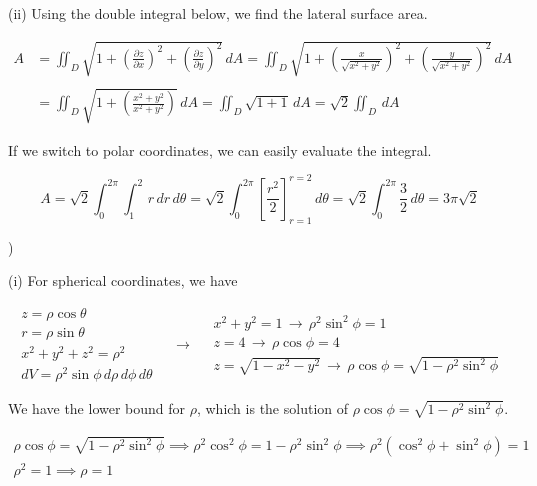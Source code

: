 \documentclass{article}
\begin{document}
\hfill

\noindent (ii) Using the double integral below, we find the lateral surface area.

\begin{align*}
A&=\iint_D\sqrt{1+\left(\frac{\partial z}{\partial x}\right)^2 +\left(\frac{\partial z}{\partial y}\right)^2}\,dA= \iint_D\sqrt{1+\left(\frac{x}{\sqrt{x^2+y^2}}\right)^2 +\left(\frac{y}{\sqrt{x^2+y^2}}\right)^2}\,dA \\\\&=\iint_D\sqrt{1+\left(\frac{x^2+y^2}{x^2+y^2}\right)}\,dA=\iint_D\sqrt{1+1}\,dA=\sqrt{2}\iint_D\,dA
\end{align*}

\hfill

\noindent If we switch to polar coordinates, we can easily evaluate the integral.

\begin{equation*}A=\sqrt2\int_0^{2\pi}\int_1^2\,r\,dr\,d\theta=\sqrt2\int_0^{2\pi}\left[\frac{r^2}2\right]_{r=1}^{r=2}\,d\theta=\sqrt2\int_0^{2\pi}\frac32\,d\theta=\boxed{3\pi\sqrt2}\end{equation*}

\newpage

)

\hfill

\noindent (i) For spherical coordinates, we have

\[
\begin{array}{c}
z=\rho\cos\theta\\
r=\rho\sin\theta\\
x^2+y^2+z^2=\rho^2\\
dV=\rho^2\sin\phi\,d\rho\,d\phi\,d\theta
\end{array}\quad\rightarrow\quad
\begin{array}{c}
x^2+y^2=1\,\rightarrow\,\rho^2\sin^2\phi = 1\\
z=4\,\rightarrow\,\rho\cos\phi=4\\
z=\sqrt{1-x^2-y^2}\,\rightarrow\,\rho\cos\phi=\sqrt{1-\rho^2\sin^2\phi}
\end{array}
\]

\hfill

\noindent We have the lower bound for $\rho$, which is the solution of $\rho\cos\phi=\sqrt{1-\rho^2\sin^2\phi}$.

\[
\begin{array}{c}
\rho\cos\phi=\sqrt{1-\rho^2\sin^2\phi}\implies\rho^2\cos^2\phi=1-\rho^2\sin^2\phi\implies
\rho^2\left(\cos^2\phi+\sin^2\phi\right)=1\\
\rho^2=1\implies\rho=1
\end{array}
\]
\end{document}
